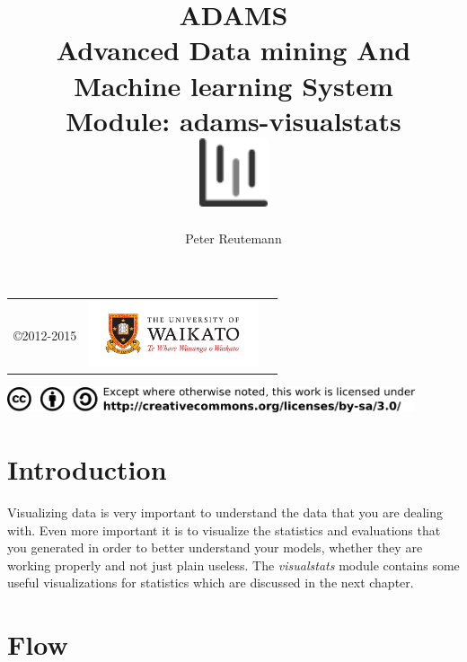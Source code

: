 \documentclass[a4paper]{book}
\title{
  \textbf{ADAMS} \\
  {\Large \textbf{A}dvanced \textbf{D}ata mining \textbf{A}nd \textbf{M}achine
  learning \textbf{S}ystem} \\
  {\Large Module: adams-visualstats} \\
  \vspace{1cm}
  \includegraphics[width=2cm]{images/visualstats-module.png} \\
}
\author{
  Peter Reutemann
}
\begin{document}
\begin{titlepage}
\maketitle

\thispagestyle{empty}
\center
\begin{table}[b]
	\begin{tabular}{c l l}
		\parbox[c][2cm]{2cm}{\copyright 2012-2015} &
		\parbox[c][2cm]{5cm}{\includegraphics[width=5cm]{images/coat_of_arms.pdf}} \\
	\end{tabular}
	\includegraphics[width=12cm]{images/cc.png} \\
\end{table}

\end{titlepage}

\tableofcontents
\listoffigures

\chapter{Introduction}
Visualizing data is very important to understand the data that you are dealing
with. Even more important it is to visualize the statistics and evaluations 
that you generated in order to better understand your models, whether they are
working properly and not just plain useless. The \textit{visualstats} module
contains some useful visualizations for statistics which are discussed in the 
next chapter.

\chapter{Flow}
\end{document}
